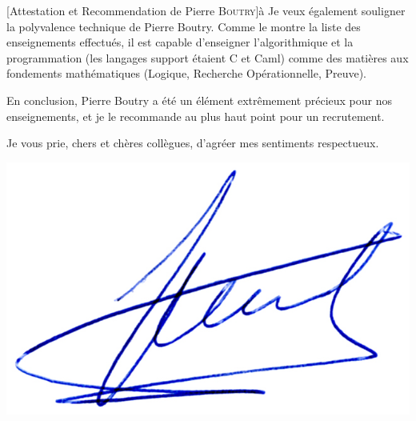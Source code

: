 \documentclass[a4paper,10pt]{article}
\begin{document}
\begin{letter}[Attestation et Recommendation de Pierre \textsc{Boutry}]{à}
\noindent Je veux également souligner la polyvalence technique de Pierre Boutry.
Comme le montre la liste des enseignements effectués, il est capable d'enseigner l'algorithmique
et la programmation (les langages support étaient C et Caml) comme des matières aux
fondements mathématiques (Logique, Recherche Opérationnelle, Preuve). 

\noindent En conclusion, Pierre Boutry a été un élément extrêmement précieux pour nos enseignements,
et je le recommande au plus haut point pour un recrutement.

Je vous prie, chers et chères collègues, d'agréer mes sentiments respectueux.
\end{letter}
\begin{flushright}
\includegraphics[width=.2\textwidth]{signgenaud.jpg}
\end{flushright}
\end{document}
